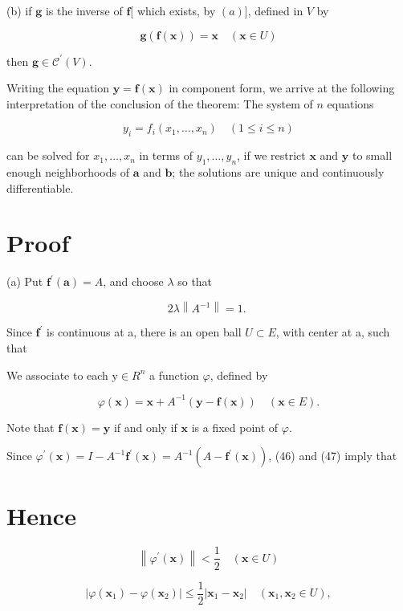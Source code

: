 \documentclass[10pt]{article}
\begin{document}
(b) if $\mathbf{g}$ is the inverse of $\mathbf{f}[$ which exists, by $(a)]$, defined in $V$ by

$$
\mathbf{g}(\mathbf{f}(\mathbf{x}))=\mathbf{x} \quad(\mathbf{x} \in U)
$$

then $\mathbf{g} \in \mathscr{C}^{\prime}(V)$.

Writing the equation $\mathbf{y}=\mathbf{f}(\mathbf{x})$ in component form, we arrive at the following interpretation of the conclusion of the theorem: The system of $n$ equations

$$
y_{i}=f_{i}\left(x_{1}, \ldots, x_{n}\right) \quad(1 \leq i \leq n)
$$

can be solved for $x_{1}, \ldots, x_{n}$ in terms of $y_{1}, \ldots, y_{n}$, if we restrict $\mathbf{x}$ and $\mathbf{y}$ to small enough neighborhoods of $\mathbf{a}$ and $\mathbf{b}$; the solutions are unique and continuously differentiable.

\section{Proof}
(a) Put $\mathbf{f}^{\prime}(\mathbf{a})=A$, and choose $\lambda$ so that

$$
2 \lambda\left\|A^{-1}\right\|=1 \text {. }
$$

Since $\mathbf{f}^{\prime}$ is continuous at a, there is an open ball $U \subset E$, with center at a, such that

We associate to each $\mathrm{y} \in R^{n}$ a function $\varphi$, defined by

$$
\varphi(\mathbf{x})=\mathbf{x}+A^{-1}(\mathbf{y}-\mathbf{f}(\mathbf{x})) \quad(\mathbf{x} \in E) .
$$

Note that $\mathbf{f}(\mathbf{x})=\mathbf{y}$ if and only if $\mathbf{x}$ is a fixed point of $\varphi$.

Since $\varphi^{\prime}(\mathbf{x})=I-A^{-1} \mathbf{f}^{\prime}(\mathbf{x})=A^{-1}\left(A-\mathbf{f}^{\prime}(\mathbf{x})\right)$, (46) and (47) imply that

\section{Hence}
$$
\left\|\varphi^{\prime}(\mathbf{x})\right\|<\frac{1}{2} \quad(\mathbf{x} \in U)
$$

$$
\left|\varphi\left(\mathbf{x}_{1}\right)-\varphi\left(\mathbf{x}_{2}\right)\right| \leq \frac{1}{2}\left|\mathbf{x}_{1}-\mathbf{x}_{2}\right| \quad\left(\mathbf{x}_{1}, \mathbf{x}_{2} \in U\right),
$$
\end{document}
